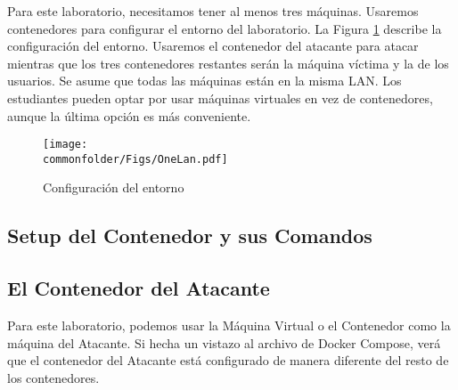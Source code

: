 Para este laboratorio, necesitamos tener al menos tres máquinas. Usaremos contenedores para configurar el entorno del laboratorio. La Figura \ref{tcp:fig:labsetup} describe la configuración del entorno.
Usaremos el contenedor del atacante para atacar mientras que los tres contenedores restantes serán la máquina víctima y la de los usuarios.
Se asume que todas las máquinas están en la misma LAN.
Los estudiantes pueden optar por usar máquinas virtuales en vez de contenedores, aunque la última opción es más conveniente.


\begin{figure}[htb]
\begin{center}
\texttt{[image: \\commonfolder/Figs/OneLan.pdf]}
\end{center}
\caption{Configuración del entorno}
\label{tcp:fig:labsetup}
\end{figure}
 

%
 

\subsection{Setup del Contenedor y sus Comandos}



 
\subsection{El Contenedor del Atacante}

Para este laboratorio, podemos usar la Máquina Virtual o el Contenedor como la máquina del Atacante. Si hecha un vistazo al archivo de Docker Compose, verá que el contenedor del Atacante está configurado de manera diferente del resto de los contenedores. 

